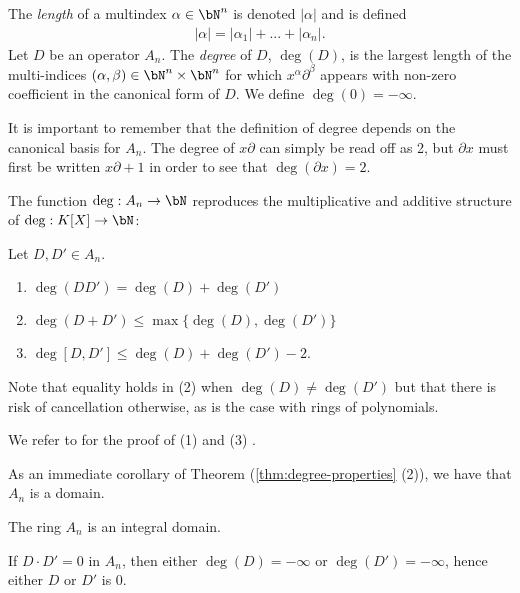 \begin{defn}\label{defn:degree-of-Weyl-operator}
	The \emph{length} of a multindex $\alpha \in \bN^n$ is denoted $|\alpha|$ and is defined
	\begin{align*}
		|\alpha| = |\alpha_1| + ... + |\alpha_n|.
	\end{align*}
	Let $D$ be an operator $A_n$. The \emph{degree} of $D$, $\deg(D)$, is the largest length of the multi-indices $(\alpha, \beta) \in \bN^n \times \bN^n$ for which $x^\alpha\partial^\beta$ appears with non-zero coefficient in the canonical form of $D$. We define $\deg(0) = -\infty$.
\end{defn}
It is important to remember that the definition of degree depends on the canonical basis for $A_n$. The degree of $x\partial$ can simply be read off as 2, but $\partial x$ must first be written $x\partial + 1$ in order to see that $\deg(\partial x) = 2$.

The function $\deg: A_n\to \bN$ reproduces the multiplicative and additive structure of $\deg:K[X]\to \bN$:
\begin{thm}\label{thm:degree-properties}
    Let $D,D' \in A_n$.
	\begin{enumerate}[(1)]
		\item $\deg(DD') = \deg(D) + \deg(D')$
		\item $\deg(D+D') \leq \max\{\deg(D), \deg(D')\}$
		\item $\deg[D,D']\leq \deg(D) + \deg(D') - 2$.
	\end{enumerate}
\end{thm}
Note that equality holds in (2) when $\deg(D) \neq \deg(D')$ but that there is risk of cancellation otherwise, as is the case with rings of polynomials.
\begin{prf}
	We refer to \cite{d-mod-primer} for the proof of (1) and (3) .
\end{prf}

As an immediate corollary of Theorem (\ref{thm:degree-properties} (2)), we have that $A_n$ is a domain.

\begin{cor}
	The ring $A_n$ is an integral domain.
\end{cor}
\begin{prf}
	If $D\cdot D' = 0$ in $A_n$, then either $\deg(D) = -\infty$ or $\deg(D') = -\infty$, hence either $D$ or $D'$ is $0$.
\end{prf}

